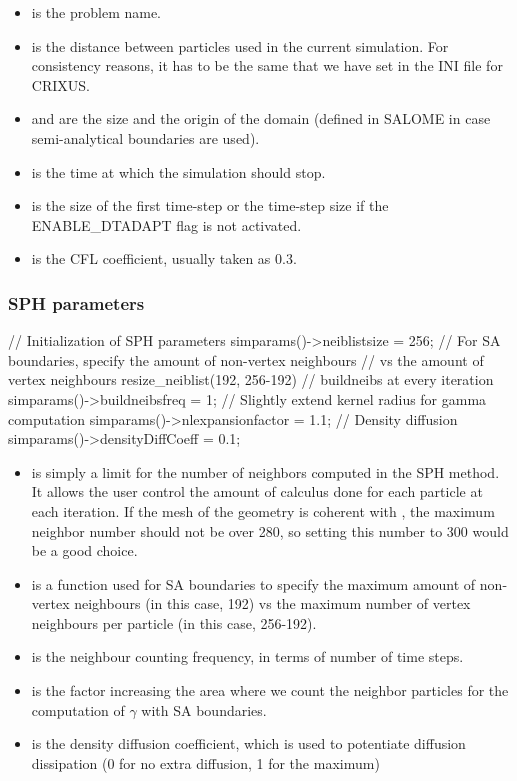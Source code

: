 \documentclass{../GPUSPHtemplate}
\begin{document}
\begin{itemize}
\item {} is the problem name.

\item {} is the distance between particles used in the current simulation. 
For consistency reasons, it has to be the same that we have set in the INI file for CRIXUS.

\item {} and  are the size and the origin of the domain 
(defined in SALOME in case semi-analytical boundaries are used).

\item {} is the time at which the simulation should stop.

\item {} is the size of the first time-step or the time-step size if the ENABLE\_DTADAPT
flag is not activated.

\item {} is the CFL coefficient, usually taken as 0.3.

\end{itemize}

\subsubsection{SPH parameters}
\begin{ccode}
// Initialization of SPH parameters
simparams()->neiblistsize = 256;
// For SA boundaries, specify the amount of non-vertex neighbours
// vs the amount of vertex neighbours
resize_neiblist(192, 256-192)
// buildneibs at every iteration
simparams()->buildneibsfreq = 1;
// Slightly extend kernel radius for gamma computation
simparams()->nlexpansionfactor = 1.1;
// Density diffusion
simparams()->densityDiffCoeff = 0.1;
\end{ccode}
\begin{itemize}
\item {} is simply a limit for the number of neighbors computed 
in the SPH method. It allows the user control the amount of calculus 
done for each particle at each iteration. If the mesh of the geometry 
is coherent with , the maximum neighbor number should not be over 280, 
so setting this number to 300 would be a good choice.
\item {} is a function used for SA boundaries to specify the maximum amount
  of non-vertex neighbours (in this case, 192) vs the maximum number of vertex neighbours per particle
  (in this case, 256-192).
\item {} is the neighbour counting frequency, 
in terms of number of time steps.
\item {} is the factor increasing the area 
where we count the neighbor particles
for the computation of $\gamma$ with SA boundaries.
\item {} is the density diffusion coefficient, which is used 
to potentiate diffusion dissipation (0 for no extra diffusion, 1 for the maximum)
\end{itemize}
\end{document}
